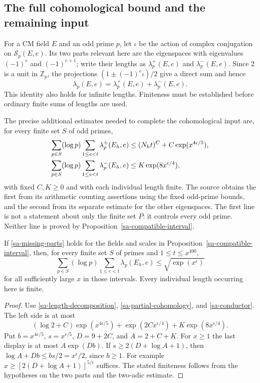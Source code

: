 \subsection{The full cohomological bound and the remaining input}

For a CM field $E$ and an odd prime $p$, let $\iota$ be the action
of complex conjugation on $\mathcal S_p(E,e)$. Its two parts relevant
here are the eigenspaces with eigenvalues $(-1)^e$ and $(-1)^{e+1}$;
write their lengths as $\lambda_p^+(E,e)$ and
$\lambda_p^-(E,e)$. Since $2$ is a unit in $\mathbb Z_p$, the
projections $(1\pm(-1)^e\iota)/2$ give a direct sum and hence
\begin{equation}\label{sa-length-decomposition}
       \lambda_p(E,e)=\lambda_p^+(E,e)+\lambda_p^-(E,e).
\end{equation}
This identity also holds for infinite lengths. Finiteness must be
established before ordinary finite sums of lengths are used.

The precise additional estimates needed to complete the
cohomological input are, for every finite set $S$ of odd primes,
\begin{align}\label{sa-missing-parts}
 \sum_{p\in S}(\log p)\sum_{1\le e<t}\lambda_p^+(E_h,e)
       &\le (N_ht)^C+C\exp(x^{4\epsilon/5}),\notag\\
 \sum_{p\in S}(\log p)\sum_{1\le e<t}\lambda_p^-(E_h,e)
       &\le K\exp(8x^{\epsilon/4}),
\end{align}
with fixed $C,K\ge0$ and with each individual length finite.
The source obtains the first from its arithmetic counting assertions
using the fixed odd-prime bounds, and the second from its separate
estimate for the other eigenspaces. The first line is not a statement
about only the finite set $P$: it controls every odd prime.
Neither line is proved by Proposition~\ref{sa-compatible-interval}.

\begin{corollary}\label{sa-full-bound}
If \eqref{sa-missing-parts} holds for the fields and scales in
Proposition~\ref{sa-compatible-interval}, then, for every finite
set $S$ of primes and $1\le t\le x^{400}$,
\[
 \sum_{p\in S}(\log p)\sum_{1\le e<t}\lambda_p(E_h,e)
       \le \sqrt{\exp(x^\epsilon)}
\]
for all sufficiently large $x$ in those intervals. Every individual
length occurring here is finite.
\end{corollary}
\begin{proof}
Use \eqref{sa-length-decomposition},
\eqref{sa-partial-cohomology}, and \eqref{sa-conductor}.
The left side is at most
\[
 (\log2+C)\exp(x^{4\epsilon/5})
       +\exp(2C x^{\epsilon/4})+K\exp(8x^{\epsilon/4}).
\]
Put $b=x^{4\epsilon/5}$, $s=x^{\epsilon/5}$,
$D=9+2C$, and $A=2+C+K$.
For $x\ge1$ the last display is at most $A\exp(Db)$.
If $s\ge2(D+\log A+1)$, then
$\log A+Db\le bs/2=x^\epsilon/2$, since $b\ge1$.
For example $x\ge[2(D+\log A+1)]^{5/\epsilon}$ suffices.
The stated finiteness follows from the hypotheses on the two
parts and the two-adic estimate.
\end{proof}


